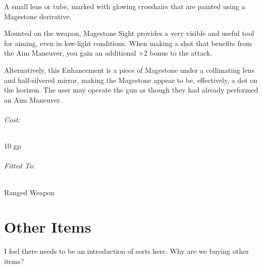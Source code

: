 \documentclass[oneside,11pt,english]{book}
\begin{document}
A small lens or tube, marked with glowing crosshairs that are painted using a
Magestone derivative.  

Mounted on the weapon, Magestone Sight provides a very visible and useful tool
for aiming, even in low-light conditions. When making a shot that benefits from
the Aim Maneuver, you gain an additional +2 bonus to the attack. 

Alternatively, this Enhancement is a piece of Magestone under a collimating lens
and half-silvered mirror, making the Magestone appear to be, effectively, a dot
on the horizon. The user may operate the gun as though they had already
performed an Aim Maneuver.  
\vspace{-15pt}\subparagraph{Cost:} 10 gp
\vspace{-15pt}\subparagraph{Fitted To:} Ranged Weapon

\chapter{Other Items}\label{ch:Other Items} %
\startcontents[chapters]
\clearpage

I feel there needs to be an introduction of sorts here. Why are we buying other items?
\end{document}
